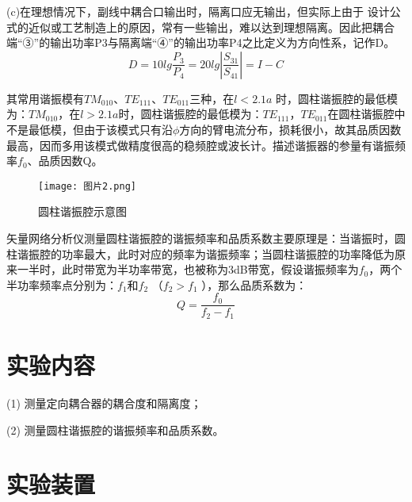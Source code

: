 \documentclass[UTF8]{ctexart}
\begin{document}
(c)在理想情况下，副线中耦合口输出时，隔离口应无输出，但实际上由于 设计公式的近似或工艺制造上的原因，常有一些输出，难以达到理想隔离。因此把耦合端“③”的输出功率P3与隔离端“④”的输出功率P4之比定义为方向性系，记作D。
\begin{equation}
    D = 10 lg \frac{P_3}{P_4} = 20 lg \left|\frac{S_{31}}{S_{41}}\right| = I - C
\end{equation}

其常用谐振模有$TM_{010}$、$TE_{111}$、$TE_{011}$三种，在$l<2.1a$ 时，圆柱谐振腔的最低模为：$TM_{010}$，在$l>2.1a$时，圆柱谐振腔的最低模为：$TE_{111}$，$TE_{011}$在圆柱谐振腔中不是最低模，但由于该模式只有沿$\phi$方向的臂电流分布，损耗很小，故其品质因数最高，因而多用该模式做精度很高的稳频腔或波长计。描述谐振器的参量有谐振频率$f_0$、品质因数Q。
\begin{figure}[!htp]
    \centering
    \texttt{[image: 图片2.png]}
    \caption{圆柱谐振腔示意图}
\end{figure}
矢量网络分析仪测量圆柱谐振腔的谐振频率和品质系数主要原理是：当谐振时，圆柱谐振腔的功率最大，此时对应的频率为谐振频率；当圆柱谐振腔的功率降低为原来一半时，此时带宽为半功率带宽，也被称为3dB带宽，假设谐振频率为$f_0$，两个半功率频率点分别为：$f_1$和$f_2$ （$f_2>f_1$ ），那么品质系数为：
\begin{equation}
    Q = \frac{f_0}{f_2 - f_1}
\end{equation}

\section{实验内容}
(1) 测量定向耦合器的耦合度和隔离度；

(2) 测量圆柱谐振腔的谐振频率和品质系数。

\section{实验装置}
\end{document}
